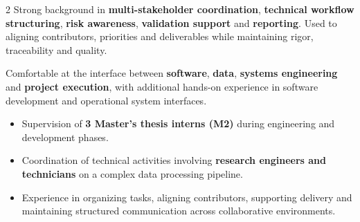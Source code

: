 \documentclass[8pt,a4paper,ragged2e,withhyper]{altacv}
\begin{document}
\begin{paracol}{2}
Strong background in \textbf{multi-stakeholder coordination}, \textbf{technical workflow structuring}, \textbf{risk awareness}, \textbf{validation support} and \textbf{reporting}. Used to aligning contributors, priorities and deliverables while maintaining rigor, traceability and quality.

Comfortable at the interface between \textbf{software}, \textbf{data}, \textbf{systems engineering} and \textbf{project execution}, with additional hands-on experience in software development and operational system interfaces.


\begin{itemize}
  \item Supervision of \textbf{3 Master’s thesis interns (M2)} during engineering and development phases.
  \item Coordination of technical activities involving \textbf{research engineers and technicians} on a complex data processing pipeline.
  \item Experience in organizing tasks, aligning contributors, supporting delivery and maintaining structured communication across collaborative environments.
\end{itemize}

\divider
{}
\divider

\medskip

\divider

\divider

\divider



\end{paracol}

{}

\end{document}
